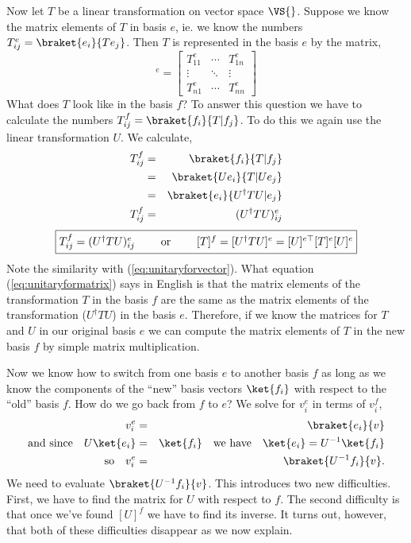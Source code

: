 Now let $T$ be a linear transformation on vector space $\VS{}$.  Suppose we know the matrix elements of $T$ in basis $e$, ie. we know the numbers $T^{e}_{ij} = \braket{e_i}{Te_j}$.  Then $T$ is represented in the basis $e$ by the matrix,
\begin{displaymath} [T]^e = \left[ \begin{array}{ccc} T^e_{11} & \cdots & T^e_{1n}\\ \vdots & \ddots & \vdots \\ T^e_{n1}&\cdots & T^e_{nn} \end{array} \right] \end{displaymath}
What does $T$ look like in the basis $f$?  To answer this question we have to calculate the numbers $T^f_{ij} = \braket{f_i}{T|f_j}$.  To do this we again use the linear transformation $U$.  We calculate,
\begin{eqnarray*}
T^f_{ij} &=& \braket{f_i}{T|f_j}\\
         &=& \braket{Ue_i}{T|Ue_j}\\
         &=& \braket{e_i}{U^{\dag}TU|e_j}\\
T^f_{ij} &=& (U^{\dag}TU)^e_{ij}
\end{eqnarray*}
\begin{equation}\label{eq:unitaryformatrix}
\framebox{$T^{f}_{ij} = (U^{\dag}TU)^{e}_{ij}$ \qquad or \qquad $[T]^f = [U^{\dag}TU]^e = [U]^{e\top}[T]^e[U]^e$}
\end{equation}
Note the similarity with (\ref{eq:unitaryforvector}).  What equation (\ref{eq:unitaryformatrix}) says in English is that the matrix elements of the transformation $T$ in the basis $f$ are the same as the matrix elements of the transformation ($U^{\dag}TU$) in the basis $e$.  Therefore, if we know the matrices for $T$ and $U$ in our original basis $e$ we can compute the matrix elements of $T$ in the new basis $f$ by simple matrix multiplication.

Now we know how to switch from one basis $e$ to another basis $f$ as long as we know the components of the ``new'' basis vectors $\ket{f_i}$ with respect to the ``old'' basis $f$.  How do we go back from $f$ to $e$?   We solve for $v_i^e$ in terms of $v_i^f$,
\begin{eqnarray*} v_i^e &=& \braket{e_i}{v} \\ \textrm{and since} \quad U\ket{e_i} &=& \ket{f_i} \quad \textrm{we have} \quad \ket{e_i} = U^{-1}\ket{f_i} \\ \textrm{so} \quad v_i^e &=& \braket{U^{-1}f_i}{v}. \end{eqnarray*}
We need to evaluate $\braket{U^{-1}f_i}{v}$.  This introduces two new difficulties.  First, we have to find the matrix for $U$ with respect to $f$.  The second difficulty is that once we've found $[U]^f$ we have to find its inverse.  It turns out, however, that both of these difficulties disappear as we now explain.

